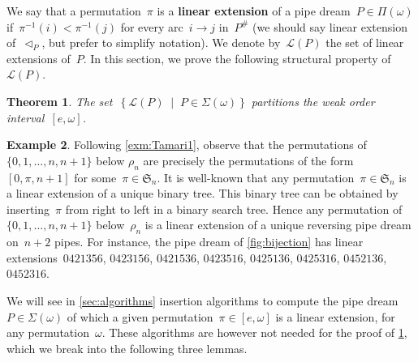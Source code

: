 \documentclass{amsart}
\newtheorem{theorem}{Theorem}[section]
\theoremstyle{definition}
\newtheorem{example}[theorem]{Example}
\newcommand{\set}[2]{\left\{ #1 \;\middle|\; #2 \right\}} %
\newcommand{\ie}{\textit{i.e.}~} %
\newcommand{\defn}[1]{\textbf{\textsf{\color{PineGreen} #1}}} %
\newcommand{\fS}{\mathfrak{S}} %
\newcommand{\pipeDreams}{\Pi} %
\newcommand{\contact}{^\#} %
\newcommand{\acyclicPipeDreams}{\Sigma} %
\newcommand{\linearExtensions}{\mathcal{L}} %
\newcommand{\less}{\vartriangleleft} %
\newcommand{\contactLess}[1]{\less_{#1}} %
\begin{document}
We say that a permutation~$\pi$ is a \defn{linear extension} of a pipe dream~$P \in \pipeDreams(\omega)$ if~$\pi^{-1}(i) < \pi^{-1}(j)$ for every arc~$i \to j$ in~$P\contact$ (we should say linear extension of~$\contactLess{P}$, but prefer to simplify notation).
We denote by~$\linearExtensions(P)$ the set of linear extensions of~$P$.
In this section, we prove the following structural property of~$\linearExtensions(P)$.

\begin{theorem}
\label{thm:partitionPipeDreams}
The set~$\set{\linearExtensions(P)}{P \in \acyclicPipeDreams(\omega)}$ partitions the weak order interval~$[e,\omega]$.
\end{theorem}

\begin{example}
\label{exm:Tamari2}
Following \cref{exm:Tamari1}, observe that the permutations of~$\{0, 1, \dots, n, n+1\}$ below $\rho_n$ are precisely the permutations of the form~$[0, \pi, n+1]$ for some~$\pi \in \fS_n$.
It is well-known that any permutation~$\pi \in \fS_n$ is a linear extension of a unique binary tree.
This binary tree can be obtained by inserting~$\pi$ from right to left in a binary search tree.
Hence any permutation of~$\{0, 1, \dots, n, n+1\}$ below~$\rho_n$ is a linear extension of a unique reversing pipe dream on~$n+2$ pipes.
For instance, the pipe dream of \cref{fig:bijection} has linear extensions~$0421356$, $0423156$, $0421536$, $0423516$, $0425136$, $0425316$, $0452136$, $0452316$.
\end{example}

We will see in \cref{sec:algorithms} insertion algorithms to compute the pipe dream~$P \in \acyclicPipeDreams(\omega)$ of which a given permutation~$\pi \in [e,\omega]$ is a linear extension, for any permutation~$\omega$.
These algorithms are however not needed for the proof of \cref{thm:partitionPipeDreams}, which we break into the following three lemmas.
\end{document}
